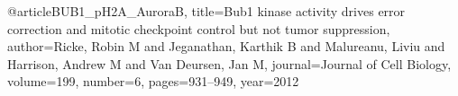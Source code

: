 @article{BUB1_pH2A_AuroraB,
  title={{Bub1} kinase activity drives error correction and mitotic checkpoint control but not tumor suppression},
  author={Ricke, Robin M and Jeganathan, Karthik B and Malureanu, Liviu and Harrison, Andrew M and Van Deursen, Jan M},
  journal={Journal of Cell Biology},
  volume={199},
  number={6},
  pages={931--949},
  year={2012}
}